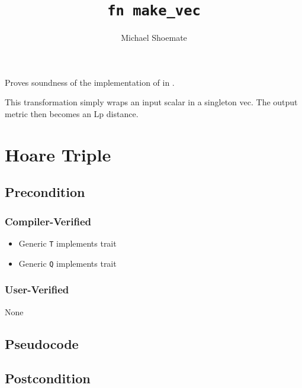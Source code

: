 \documentclass{article}
\title{\texttt{fn make\_vec}}
\author{Michael Shoemate}
\date{}
\begin{document}
\maketitle

\contrib
Proves soundness of the implementation of  in .

This transformation simply wraps an input scalar in a singleton vec.
The output metric then becomes an Lp distance.
\section{Hoare Triple}
\subsection*{Precondition}
\subsubsection*{Compiler-Verified}
\begin{itemize}
    \item Generic \texttt{T} implements trait 
    \item Generic \texttt{Q} implements trait 
\end{itemize}

\subsubsection*{User-Verified}
None

\subsection*{Pseudocode}


\subsection*{Postcondition}
\begin{theorem}
\end{theorem}
\end{document}
